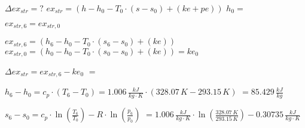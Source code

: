 \( \Delta ex_{str} = ? \)  
\( ex_{str} = (h - h_0 - T_0 \cdot (s - s_0) + (ke + pe)) \)  
\( h_0 = \)  

\( ex_{str,6} = ex_{str,0} \)  

\( ex_{str,6} = (h_6 - h_0 - T_0 \cdot (s_6 - s_0) + (ke)) \)  
\( ex_{str,0} = (h_0 - h_0 - T_0 \cdot (s_0 - s_0) + (ke)) = ke_0 \)  

\( \Delta ex_{str} = ex_{str,6} - ke_0 \)  
\( = \)  

\( h_6 - h_0 = c_p \cdot (T_6 - T_0) = 1.006 \, \frac{kJ}{kg \cdot K} \cdot (328.07 \, K - 293.15 \, K) \)  
\( = 85.429 \, \frac{kJ}{kg} \)  

\( s_6 - s_0 = c_p \cdot \ln \left( \frac{T_6}{T_0} \right) - R \cdot \ln \left( \frac{p_6}{p_0} \right) \)  
\( = 1.006 \, \frac{kJ}{kg \cdot K} \cdot \ln \left( \frac{328.07 \, K}{293.15 \, K} \right) - 0.30735 \, \frac{kJ}{kg \cdot K} \)
